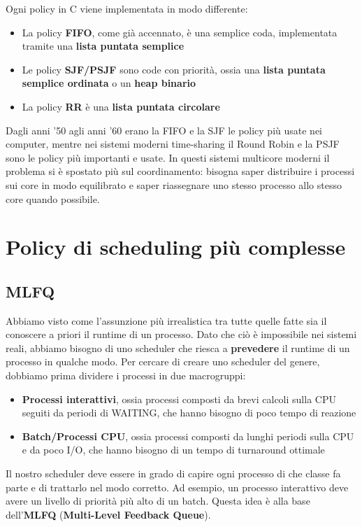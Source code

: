 \documentclass[11pt, a4paper, titlepage, oneside]{scrbook}
\begin{document}
Ogni policy in C viene implementata in modo differente:
\begin{itemize}
    \item La policy \textbf{FIFO}, come già accennato, è una semplice coda, implementata tramite una \textbf{lista puntata semplice}
    \item Le policy \textbf{SJF/PSJF} sono code con priorità, ossia una \textbf{lista puntata semplice ordinata} o un \textbf{heap binario}
    \item La policy \textbf{RR} è una \textbf{lista puntata circolare}
\end{itemize}

Dagli anni '50 agli anni '60 erano la FIFO e la SJF le policy più usate nei computer, mentre nei sistemi moderni time-sharing il Round Robin e la PSJF sono le policy più importanti e usate. In questi sistemi multicore moderni il problema si è spostato più sul coordinamento: bisogna saper distribuire i processi sui core in modo equilibrato e saper riassegnare uno stesso processo allo stesso core quando possibile.

\section{Policy di scheduling più complesse}

\subsection{MLFQ}

Abbiamo visto come l'assunzione più irrealistica tra tutte quelle fatte sia il conoscere a priori il runtime di un processo. Dato che ciò è impossibile nei sistemi reali, abbiamo bisogno di uno scheduler che riesca a \textbf{prevedere} il runtime di un processo in qualche modo. Per cercare di creare uno scheduler del genere, dobbiamo prima dividere i processi in due macrogruppi:
\begin{itemize}
    \item \textbf{Processi interattivi}, ossia processi composti da brevi calcoli sulla CPU seguiti da periodi di WAITING, che hanno bisogno di poco tempo di reazione
    \item \textbf{Batch/Processi CPU}, ossia processi composti da lunghi periodi sulla CPU e da poco I/O, che hanno bisogno di un tempo di turnaround ottimale
\end{itemize}

Il nostro scheduler deve essere in grado di capire ogni processo di che classe fa parte e di trattarlo nel modo corretto. Ad esempio, un processo interattivo deve avere un livello di priorità più alto di un batch. Questa idea è alla base dell'\textbf{MLFQ} (\textbf{Multi-Level Feedback Queue}).
\end{document}
